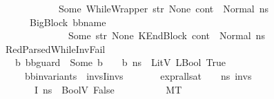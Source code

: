 \begin{isabellebody}
\ \ \ \ \ \ \ \ \ \ \ \ \ \ {\isacharparenleft}{\kern0pt}Some\ {\isacharparenleft}{\kern0pt}WhileWrapper\ str{\isacharparenright}{\kern0pt}{\isacharparenright}{\kern0pt}\ None{\isacharparenright}{\kern0pt}{\isacharcomma}{\kern0pt}\ cont{}{\isacharcomma}{\kern0pt}\ \ Normal\ n{\isacharunderscore}{\kern0pt}s{\isacharparenright}{\kern0pt}{\isasymrangle}\ {\isasymlongrightarrow}\isanewline
\ \ \ \ \ \ \ \ {\isacharparenleft}{\kern0pt}{\isacharparenleft}{\kern0pt}BigBlock\ bb{\isacharunderscore}{\kern0pt}name\ {\isacharbrackleft}{\kern0pt}{\isacharbrackright}{\kern0pt}\ \isanewline
\ \ \ \ \ \ \ \ \ \ \ \ \ \ \ \ {\isacharparenleft}{\kern0pt}Some\ str{\isacharparenright}{\kern0pt}\ None{\isacharparenright}{\kern0pt}{\isacharcomma}{\kern0pt}\ {\isacharparenleft}{\kern0pt}KEndBlock\ cont{}{\isacharparenright}{\kern0pt}{\isacharcomma}{\kern0pt}\ \ Normal\ n{\isacharunderscore}{\kern0pt}s{\isacharparenright}{\kern0pt}{\isachardoublequoteclose}\isanewline
\ \isanewline
\ \ {\isacharbar}{\kern0pt}\ RedParsedWhile{\isacharunderscore}{\kern0pt}InvFail{\isacharcolon}{\kern0pt}\ \isanewline
\ \ \ \ {\isachardoublequoteopen}{\isasymlbrakk}{\isasymAnd}\ b{\isachardot}{\kern0pt}\ bb{\isacharunderscore}{\kern0pt}guard\ {\isacharequal}{\kern0pt}\ {\isacharparenleft}{\kern0pt}Some\ b{\isacharparenright}{\kern0pt}\ {\isasymLongrightarrow}\ {\isasymLambda}{\isacharcomma}{\kern0pt}{\isasymGamma}{\isacharcomma}{\kern0pt}{\isasymOmega}\ {\isasymturnstile}\ {\isasymlangle}b{\isacharcomma}{\kern0pt}\ n{\isacharunderscore}{\kern0pt}s{\isasymrangle}\ {\isasymDown}\ LitV\ {\isacharparenleft}{\kern0pt}LBool\ True{\isacharparenright}{\kern0pt}{\isacharsemicolon}{\kern0pt}\ \isanewline
\ \ \ \ \ \ \ bb{\isacharunderscore}{\kern0pt}invariants\ {\isacharequal}{\kern0pt}\ invs{}{\isacharat}{\kern0pt}{\isacharbrackleft}{\kern0pt}I{\isacharbrackright}{\kern0pt}{\isacharat}{\kern0pt}invs{}{\isacharsemicolon}{\kern0pt}\isanewline
\ \ \ \ \ \ \ expr{\isacharunderscore}{\kern0pt}all{\isacharunderscore}{\kern0pt}sat\ {\isasymLambda}\ {\isasymGamma}\ {\isasymOmega}\ n{\isacharunderscore}{\kern0pt}s\ invs{}{\isacharsemicolon}{\kern0pt}\isanewline
\ \ \ \ \ \ \ {\isasymLambda}{\isacharcomma}{\kern0pt}{\isasymGamma}{\isacharcomma}{\kern0pt}{\isasymOmega}\ {\isasymturnstile}\ {\isasymlangle}I{\isacharcomma}{\kern0pt}\ n{\isacharunderscore}{\kern0pt}s{\isasymrangle}\ {\isasymDown}\ BoolV\ False\ {\isasymrbrakk}\ \isanewline
\ \ \ \ \ \ \ {\isasymLongrightarrow}\ M{\isacharcomma}{\kern0pt}{\isasymLambda}{\isacharcomma}{\kern0pt}{\isasymGamma}{\isacharcomma}{\kern0pt}{\isasymOmega}{\isacharcomma}{\kern0pt}T\ {\isasymturnstile}\ \isanewline

\end{isabellebody}
